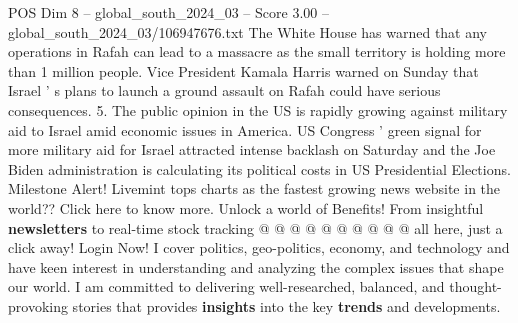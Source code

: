 \begin{textsample}{POS Dim 8 – global\_south\_2024\_03 – Score 3.00 – global\_south\_2024\_03/106947676.txt}
The White House has warned that any operations in Rafah can lead to a massacre as the small territory is holding more than 1 million people.
Vice President Kamala Harris warned on Sunday that Israel ' s plans to launch a ground assault on Rafah could have serious consequences. 5.
The public opinion in the US is rapidly growing against military aid to Israel amid economic issues in America.
US Congress ' green signal for more military aid for Israel attracted intense backlash on Saturday and the Joe Biden administration is calculating its political costs in US Presidential Elections.
Milestone Alert!
Livemint tops charts as the fastest growing news website in the world??
Click here to know more.
Unlock a world of Benefits!
From insightful \textbf{newsletters} to real-time stock tracking @ @ @ @ @ @ @ @ @ @ all here, just a click away!
Login Now!
I cover politics, geo-politics, economy, and technology and have keen interest in understanding and analyzing the complex issues that shape our world.
I am committed to delivering well-researched, balanced, and thought-provoking stories that provides \textbf{insights} into the key \textbf{trends} and developments.

\end{textsample}
